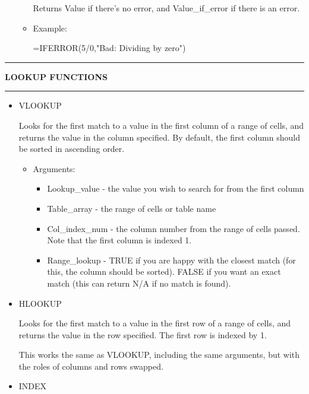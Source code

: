 \documentclass[8pt]{extarticle}
\newcommand{\heading}[1]{%
    \noindent
    \rule{\linewidth}{0.4pt}
    \begin{center}
        \vspace{-1ex}
        \textbf{#1}        
        \vspace{-2.5ex}
    \end{center}
    \rule{\linewidth}{0.4pt}
}
\begin{document}
\begin{multicols}{3}
\begin{itemize}
\begin{itemize}
        Returns Value if there's no error, and Value\_if\_error if there is an error.
        \item Example:

        =IFERROR(5/0,"Bad: Dividing by zero")
    \end{itemize}
\end{itemize}

\heading{LOOKUP FUNCTIONS}

\begin{itemize}
    \item VLOOKUP
    
    Looks for the first match to a value in the first column of a range of cells, and returns the value in the column specified. By default, the first column should be sorted in ascending order.
    \begin{itemize}
        \item Arguments:
        \begin{itemize}
            \item Lookup\_value - the value you wish to search for from the first column
            \item Table\_array - the range of cells or table name
            \item Col\_index\_num - the column number from the range of cells passed. Note that the first column is indexed 1.
            \item Range\_lookup - TRUE if you are happy with the closest match (for this, the column should be sorted). FALSE if you want an exact match (this can return N/A if no match is found).
        \end{itemize}
    \end{itemize}
\end{itemize}

\begin{itemize}
    \item HLOOKUP 
    
    Looks for the first match to a value in the first row of a range of cells, and returns the value in the row specified. The first row is indexed by 1. 
    
    This works the same as VLOOKUP, including the same arguments, but with the roles of columns and rows swapped.
\end{itemize}

\begin{itemize}
    \item INDEX 
    

\end{itemize}
\end{multicols}
\end{document}

